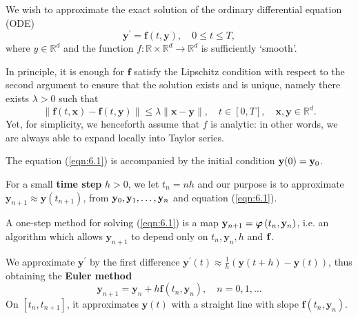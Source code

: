 \documentclass[a4paper]{article}
\begin{document}
\begin{problem}
    We wish to approximate the exact solution of the ordinary differential equation (ODE)
\begin{equation}\label{eqn:6.1}
    \mathbf{y}^{\prime}=\mathbf{f}(t, \mathbf{y}), \quad 0 \leq t \leq T,
\end{equation}
where $y \in \mathbb{R}^d$ and the function $f: \mathbb{R} \times \mathbb{R}^d \rightarrow \mathbb{R}^d$ is sufficiently `smooth'.
\end{problem}

In principle, it is enough for $\mathbf{f}$ satisfy the Lipschitz condition with respect to the second argument to ensure that the solution exists and is unique, namely there exists $\lambda>0$ such that
\begin{equation}\label{eqn:6.2}
    \|\mathbf{f}(t, \mathbf{x})-\mathbf{f}(t, \mathbf{y})\| \leq \lambda\|\mathbf{x}-\mathbf{y}\|, \quad t \in[0, T], \quad \mathbf{x}, \mathbf{y} \in \mathbb{R}^d .
\end{equation}
Yet, for simplicity, we henceforth assume that $f$ is analytic: in other words, we are always able to expand locally into Taylor series.

The equation (\ref{eqn:6.1}) is accompanied by the initial condition ${\bf y}(0)={\bf y}_0$.

For a small \textbf{time step} $h>0$, we let $t_n=n h$ and our purpose is to approximate $\mathbf{y}_{n+1} \approx \mathbf{y}\left(t_{n+1}\right)$, from ${\bf y}_0, {\bf y}_1, \ldots, {\bf y}_n$ and equation (\ref{eqn:6.1}).

\begin{definition}
    A one-step method for solving (\ref{eqn:6.1}) is a map $\mathbf{y}_{n+1}=\boldsymbol{\varphi}\left(t_n, {\bf y}_n\right)$, i.e. an algorithm which allows $\mathbf{y}_{n+1}$ to depend only on $t_n, \mathbf{y}_n, h$ and ${\bf f}$.
\end{definition}

\begin{method}
    We approximate $\mathbf{y}^{\prime}$ by the first difference $\mathbf{y}^{\prime}(t) \approx \frac{1}{h}(\mathbf{y}(t+h)-\mathbf{y}(t))$, thus obtaining the \textbf{Euler method}
\begin{equation}\label{eqn:6.3}
    \mathbf{y}_{n+1}=\mathbf{y}_n+h \mathbf{f}\left(t_n, \mathbf{y}_n\right), \quad n=0,1, \ldots
\end{equation}
On $\left[t_n, t_{n+1}\right]$, it approximates $\mathbf{y}(t)$ with a straight line with slope $\mathbf{f}\left(t_n, \mathbf{y}_{n}\right)$.
\end{method}
\end{document}
